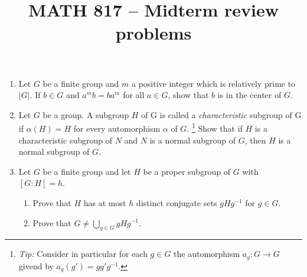 \documentclass[12pt]{article}
\theoremstyle{theorem}
\theoremstyle{definition}
\begin{document}
\title{ \vspace {-2em}MATH 817 -- Midterm review problems }
\date{}
\maketitle


\begin{enumerate}
\phantom{a}
 \vspace {-5em}
\item  Let $G$ be a finite group and $m$ a positive integer which is relatively prime to $|G|$. If $b \in G$ 
and $a^mb=ba^m$ for all $a\in G$, show that $b$ is in the center of $G$.

\medskip

%

\item Let $G$ be a group. A subgroup $H$ of G is called 
a {\it characteristic} subgroup of G if $\alpha(H) = H$
for every automorphism $\alpha$ of $G$. \footnote{{\em Tip:} Consider in particular for each $g\in G$ the automorphism $a_g:G\to G$ givend by $a_g(g')=gg'g^{-1}$.}
Show that if $H$ is a characteristic subgroup of $N$ and $N$ is
a normal subgroup of $G$, then $H$ is a normal subgroup of $G$.

\medskip


\item 
Let $G$ be a finite group and let $H$ be a proper subgroup of $G$ with $[G:H]=h$. 
\begin{enumerate}
\item Prove that $H$ has at most $h$ distinct conjugate sets  $gHg^{-1}$ for $g\in G$.
\item
Prove that $G\neq \bigcup_{g\in G}  gHg^{-1}$.
\end{enumerate}


\end{enumerate}
\end{document}
